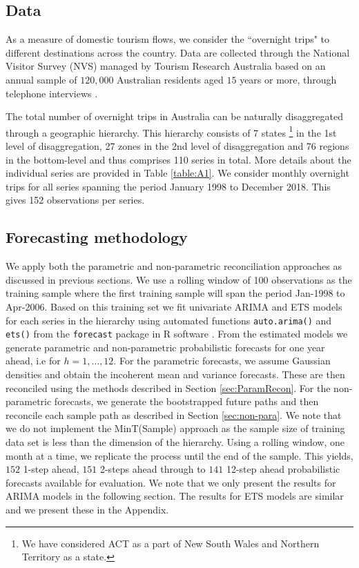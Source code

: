 \documentclass[12pt]{article}
\theoremstyle{definition}
\begin{document}
\subsection{Data}
As a measure of domestic tourism flows, we consider the ``overnight trips" to different destinations across the country.
Data are collected through the National Visitor Survey (NVS) managed by Tourism Research Australia based on an annual sample of $120,000$ Australian residents aged $15$ years or more, through telephone interviews \citep{TourismResearch2019}.

The total number of overnight trips in Australia can be naturally disaggregated through a geographic hierarchy. This hierarchy consists of 7 states \footnote{We have considered ACT as a part of New South Wales and Northern Territory as a state.} in the 1st level of disaggregation, 27 zones in the 2nd level of disaggregation and 76 regions in the bottom-level and thus comprises 110 series in total. More details about the individual series are provided in Table \ref{table:A1}.
We consider monthly overnight trips for all series spanning the period January 1998 to December 2018. This gives 152 observations per series.

\subsection{Forecasting methodology}

We apply both the parametric and non-parametric reconciliation approaches as discussed in previous sections. We use a rolling window of 100 observations as the training sample where the first training sample will span the period Jan-1998 to Apr-2006. Based on this training set we fit univariate ARIMA and ETS models for each series in the hierarchy using automated functions \verb|auto.arima()| and \verb|ets()| from the \verb|forecast| package \citep{Rforecast} in R software \citep{Rcore}.
From the estimated models we generate parametric and non-parametric probabilistic forecasts for one year ahead, i.e for $h=1,\dots,12$. For the parametric forecasts, we assume Gaussian densities and obtain the incoherent mean and variance forecasts. These are then reconciled using the methods described in Section \ref{sec:ParamRecon}. For the non-parametric forecasts, we generate the bootstrapped future paths and then reconcile each sample path as described in Section \ref{sec:non-para}. We note that we do not implement the MinT(Sample) approach as the sample size of training data set is less than the dimension of the hierarchy. Using a rolling window, one month at a time, we replicate the process until the end of the sample. This yields, $152$ 1-step ahead, $151$ 2-steps ahead through to $141$ 12-step ahead probabilistic forecasts available for evaluation. We note that we only present the results for ARIMA models in the following section. The results for ETS models are similar and we present these in the Appendix.
\end{document}
